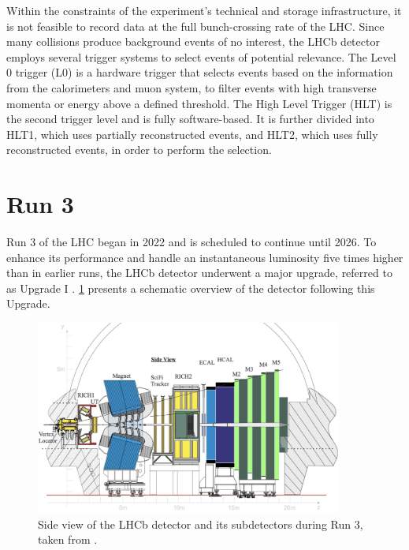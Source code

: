 Within the constraints of the experiment’s technical and storage infrastructure, it is not feasible to record data at the full bunch-crossing rate of the LHC. Since many collisions produce background events of no interest, the LHCb detector employs several trigger systems to select events of potential relevance. The Level 0 trigger (L0) is a hardware trigger that selects events based on the information from the calorimeters and muon system, to filter events with high transverse momenta or energy above a defined threshold. The High Level Trigger (HLT) is the second trigger level and is fully software-based. It is further divided into HLT1, which uses partially reconstructed events, and HLT2, which uses fully reconstructed events, in order to perform the selection.

\section{Run 3}
\label{sec:lhcb_run3}
Run 3 of the LHC began in 2022 and is scheduled to continue until 2026. To enhance its performance and handle an instantaneous luminosity five times higher than in earlier runs, the LHCb detector underwent a major upgrade, referred to as Upgrade I \cite{lhcb_upgrade_I}. \cref{fig:lhcb_run3} presents a schematic overview of the detector following this Upgrade.
\begin{figure}
    \centering
    \includegraphics[width=0.9\textwidth]{figures/lhcb_run3.png}
    \caption{Side view of the LHCb detector and its subdetectors during Run 3, taken from \cite{lhcb_upgrade_I}.}
    \label{fig:lhcb_run3}
\end{figure}

